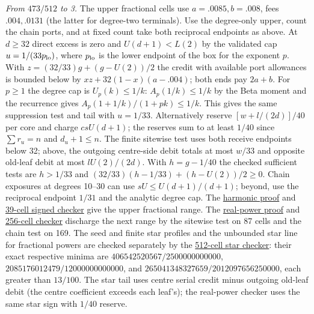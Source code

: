 \documentclass[11pt]{article}
\newcommand{\proofsrc}[2]{\href{https://github.com/uzay-eth/friend-tree-exponent/blob/a0972085ad72ad5685ae7b424988648d1965e73c/#1}{#2}}
\theoremstyle{remark}
\numberwithin{equation}{section}
\begin{document}
\emph{From $473/512$ to 3.} The upper fractional cells use $a=.0085,b=.008$, fees $.004,.0131$ (the latter for degree-two terminals). Use the degree-only upper, count the chain ports, and at fixed count take both reciprocal endpoints as above. At $d\ge32$ direct excess is zero and $U(d+1)<L(2)$ by the validated cap $u=1/(33p_{\rm lo})$, where $p_{\rm lo}$ is the lower endpoint of the box for the exponent $p$. With $z=(32/33)g+(g-U(2))/2$ the credit with available port allowances is bounded below by $xz+32(1-x)(a-.004)$; both ends pay $2a+b$. For $p\ge1$ the degree cap is $U_p(k)\le1/k$: $A_p(1/k)\le1/k$ by the Beta moment and the recurrence gives $A_p(1+1/k)/(1+pk)\le1/k$. This gives the same suppression test and tail with $u=1/33$. Alternatively reserve $[w+l/(2d)]/40$ per core and charge $csU(d+1)$; the reserves sum to at least $1/40$ since $\sum r_u=n$ and $d_u+1\le n$. The finite sitewise test uses both receive endpoints below 32; above, the outgoing centre-side debit totals at most $w/33$ and opposite old-leaf debit at most $lU(2)/(2d)$. With $h=g-1/40$ the checked sufficient tests are $h>1/33$ and $(32/33)(h-1/33)+(h-U(2))/2\ge0$. Chain exposures at degrees 10--30 can use $sU\le U(d+1)/(d+1)$; beyond, use the reciprocal endpoint $1/31$ and the analytic degree cap. The \proofsrc{round2/proofs/astra-late/source/round2/open/age-order/hub-ranking/fractional-middle/README.md}{harmonic proof} and \proofsrc{round2/proofs/astra-late/source/round2/open/age-order/hub-ranking/fractional-middle/check.py}{39-cell signed checker} give the upper fractional range. The \proofsrc{round2/proofs/astra-late/source/round2/open/age-order/hub-ranking/mean-ledger/real/README.md}{real-power proof} and \proofsrc{round2/proofs/astra-late/source/round2/open/age-order/hub-ranking/mean-ledger/real/check.py}{256-cell checker} discharge the next range by the sitewise test on 87 cells and the chain test on 169. The seed and finite star profiles and the unbounded star line for fractional powers are checked separately by the \proofsrc{round2/proofs/astra-late/source/round2/open/age-order/hub-ranking/mean-ledger/fractional/star_bound.py}{512-cell star checker}: their exact respective minima are $406542520567/2500000000000$, $2085176012479/12000000000000$, and $265041348327659/2012097656250000$, each greater than $13/100$. The star tail uses centre serial credit minus outgoing old-leaf debit (the centre coefficient exceeds each leaf's); the real-power checker uses the same star sign with $1/40$ reserve.
\end{document}

